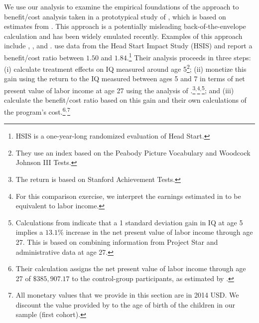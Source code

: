 We use our analysis to examine the empirical foundations of the approach to benefit/cost analysis taken in a prototypical study of \citet{Kline_Walters_2016_QJE}, which is based on estimates from \citet{Chetty_Friedman_etal_2011_QJoE}. This approach is a potentially misleading back-of-the-envelope calculation and has been widely emulated recently. Examples of this approach include \citet{Attanasio_Kugler_Meghir_2011_AEJAE}, \cite{Behrman-et-al_2011_JHR-Progresa}, and \cite{Deshpande_Yue_2017_Screened_Unpublished}. \citet{Kline_Walters_2016_QJE} use data from the Head Start Impact Study (HSIS) and report a benefit/cost ratio between $1.50$ and $1.84$.\footnote{HSIS is a one-year-long randomized evaluation of Head Start.} Their analysis proceeds in three steps: (i) calculate treatment effects on IQ measured around age 5\footnote{They use an index based on the Peabody Picture Vocabulary and Woodcock Johnson III Tests.}; (ii) monetize this gain using the return to the IQ measured between ages 5 and 7 in terms of net present value of labor income at age 27 using the analysis of \citet{Chetty_Friedman_etal_2011_QJoE}.\footnote{The \citet{Chetty_Friedman_etal_2011_QJoE} return is based on Stanford Achievement Tests.}$^,$\footnote{For this comparison exercise, we interpret the earnings estimated in \citet{Chetty_Friedman_etal_2011_QJoE} to be equivalent to labor income.}$^,$\footnote{Calculations from \citet{Chetty_Friedman_etal_2011_QJoE} indicate that a 1 standard deviation gain in IQ at age 5 implies a $13.1\%$ increase in the net present value of labor income through age 27. This is based on combining information from Project Star and administrative data at age 27.}; and (iii) calculate the benefit/cost ratio based on this gain and their own calculations of the program's cost.\footnote{Their calculation assigns the net present value of labor income through age 27 of $\$385,907.17$ to the control-group participants, as estimated by  \citet{Chetty_Friedman_etal_2011_QJoE}.}$^,$\footnote{All monetary values that we provide in this section are in 2014 USD. We discount the value provided by \citet{Chetty_Friedman_etal_2011_QJoE} to the age of birth of the children in our sample (first cohort).}

